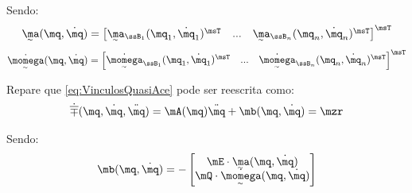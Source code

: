 \documentclass[]{politex}
\begin{document}
Sendo:
\begin{equation}
\underaccent{\sim}{\ma}(\mq, \dot{\mq}) = \begin{bmatrix}
\underaccent{\sim}{\ma}_{\ssB_1}(\mq_1, \dot{\mq}_1)^\msT & ... & \underaccent{\sim}{\ma}_{\ssB_n}(\mq_n, \dot{\mq}_n)^\msT
\end{bmatrix}^\msT
\end{equation}
\begin{equation}
\underaccent{\sim}{\dot{\momega}}(\mq, \dot{\mq}) = \begin{bmatrix}
\underaccent{\sim}{\dot{\momega}}_{\ssB_1}(\mq_1, \dot{\mq}_1)^\msT & ... & \underaccent{\sim}{\dot{\momega}}_{\ssB_n}(\mq_n, \dot{\mq}_n)^\msT
\end{bmatrix}^\msT
\end{equation}

Repare que \eqref{eq:VinculosQuasiAce} pode ser reescrita como:
\begin{equation} \label{eq:VinculosQuasiAce_}
\dot{\overline{\mp}}(\mq,\dot{\mq},\ddot{\mq}) = \mA(\mq)\ddot{\mq} + \mb(\mq,\dot{\mq}) = \mzr
\end{equation}

Sendo:
\begin{equation}
\mb(\mq,\dot{\mq}) =
-\begin{bmatrix}
\mE \cdot \underaccent{\sim}{\ma}(\mq, \dot{\mq}) \\
\mQ \cdot \underaccent{\sim}{\dot{\momega}}(\mq, \dot{\mq}) \\
\end{bmatrix}
\end{equation}
\end{document}
